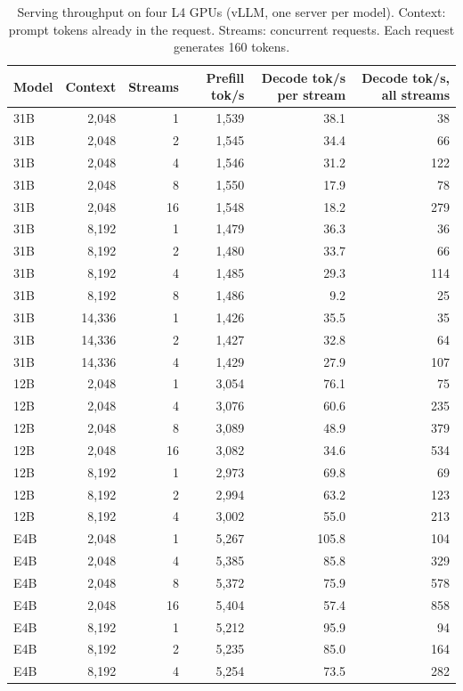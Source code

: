 \begin{table}[t]
\centering
\small
\caption{Serving throughput on four L4 GPUs (vLLM, one server per model). Context: prompt tokens already in the request. Streams: concurrent requests. Each request generates 160 tokens.}
\label{tab:serving}
\begin{tabular}{lrrrrr}
\toprule
Model & Context & Streams & Prefill tok/s & Decode tok/s per stream & Decode tok/s, all streams \\
\midrule
31B & 2{,}048 & 1 & 1{,}539 & 38.1 & 38 \\
31B & 2{,}048 & 2 & 1{,}545 & 34.4 & 66 \\
31B & 2{,}048 & 4 & 1{,}546 & 31.2 & 122 \\
31B & 2{,}048 & 8 & 1{,}550 & 17.9 & 78 \\
31B & 2{,}048 & 16 & 1{,}548 & 18.2 & 279 \\
31B & 8{,}192 & 1 & 1{,}479 & 36.3 & 36 \\
31B & 8{,}192 & 2 & 1{,}480 & 33.7 & 66 \\
31B & 8{,}192 & 4 & 1{,}485 & 29.3 & 114 \\
31B & 8{,}192 & 8 & 1{,}486 & 9.2 & 25 \\
31B & 14{,}336 & 1 & 1{,}426 & 35.5 & 35 \\
31B & 14{,}336 & 2 & 1{,}427 & 32.8 & 64 \\
31B & 14{,}336 & 4 & 1{,}429 & 27.9 & 107 \\
\addlinespace
12B & 2{,}048 & 1 & 3{,}054 & 76.1 & 75 \\
12B & 2{,}048 & 4 & 3{,}076 & 60.6 & 235 \\
12B & 2{,}048 & 8 & 3{,}089 & 48.9 & 379 \\
12B & 2{,}048 & 16 & 3{,}082 & 34.6 & 534 \\
12B & 8{,}192 & 1 & 2{,}973 & 69.8 & 69 \\
12B & 8{,}192 & 2 & 2{,}994 & 63.2 & 123 \\
12B & 8{,}192 & 4 & 3{,}002 & 55.0 & 213 \\
\addlinespace
E4B & 2{,}048 & 1 & 5{,}267 & 105.8 & 104 \\
E4B & 2{,}048 & 4 & 5{,}385 & 85.8 & 329 \\
E4B & 2{,}048 & 8 & 5{,}372 & 75.9 & 578 \\
E4B & 2{,}048 & 16 & 5{,}404 & 57.4 & 858 \\
E4B & 8{,}192 & 1 & 5{,}212 & 95.9 & 94 \\
E4B & 8{,}192 & 2 & 5{,}235 & 85.0 & 164 \\
E4B & 8{,}192 & 4 & 5{,}254 & 73.5 & 282 \\
\bottomrule
\end{tabular}
\end{table}

